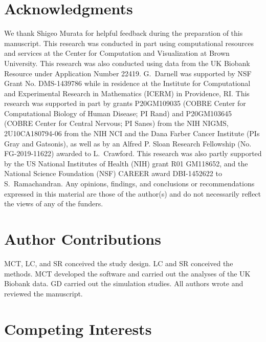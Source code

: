 \documentclass[10pt]{article}
\begin{document}

\section*{Acknowledgments}\label{MAPITR-Acknowledgments}

We thank Shigeo Murata for helpful feedback during the preparation of this manuscript. This research was conducted in part using computational resources and services at the Center for Computation and Visualization at Brown University. This research was also conducted using data from the UK Biobank Resource under Application Number 22419. G.~Darnell was supported by NSF Grant No. DMS-1439786 while in residence at the Institute for Computational and Experimental Research in Mathematics (ICERM) in Providence, RI. This research was supported in part by grants P20GM109035 (COBRE Center for Computational Biology of Human Disease; PI Rand) and P20GM103645 (COBRE Center for Central Nervous; PI Sanes) from the NIH NIGMS, 2U10CA180794-06 from the NIH NCI and the Dana Farber Cancer Institute (PIs Gray and Gatsonis), as well as by an Alfred P. Sloan Research Fellowship (No. FG-2019-11622) awarded to L.~Crawford. This research was also partly supported by the US National Institutes of Health (NIH) grant R01 GM118652, and the National Science Foundation (NSF) CAREER award DBI-1452622 to S.~Ramachandran. Any opinions, findings, and conclusions or recommendations expressed in this material are those of the author(s) and do not necessarily reflect the views of any of the funders.


\section*{Author Contributions}\label{MAPITR-Author-Contributions}

MCT, LC, and SR conceived the study design. LC and SR conceived the methods. MCT developed the software and carried out the analyses of the UK Biobank data. GD carried out the simulation studies. All authors wrote and reviewed the manuscript.


\section*{Competing Interests}\label{MAPITR-Competing-Interests}
\end{document}
